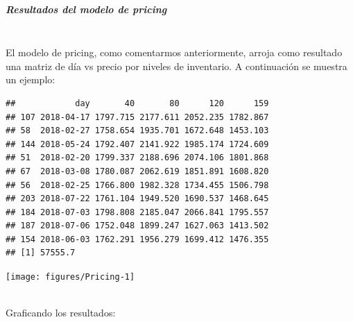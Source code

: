 \documentclass{article}\usepackage[]{graphicx}\usepackage[]{color}
\makeatletter
\newenvironment{kframe}{%
 \def\at@end@of@kframe{}%
 \ifinner\ifhmode%
  \def\at@end@of@kframe{\end{minipage}}%
  \begin{minipage}{\columnwidth}%
 \fi\fi%
 \def\FrameCommand##1{\hskip\@totalleftmargin \hskip-\fboxsep
 \colorbox{shadecolor}{##1}\hskip-\fboxsep
     \hskip-\linewidth \hskip-\@totalleftmargin \hskip\columnwidth}%
 \MakeFramed {\advance\hsize-\width
   \@totalleftmargin\z@ \linewidth\hsize
   \@setminipage}}%
 {\par\unskip\endMakeFramed%
 \at@end@of@kframe}
\newenvironment{knitrout}{}{} %
\makeatother
\begin{document}
\subparagraph{Resultados del modelo de pricing}~\\
El modelo de pricing, como comentarmos anteriormente, arroja como resultado una matriz de día vs precio por niveles de inventario. A continuación se muestra un ejemplo:
~\\
\begin{knitrout}
\color{fgcolor}\begin{kframe}
\begin{verbatim}
##            day       40       80      120      159
## 107 2018-04-17 1797.715 2177.611 2052.235 1782.867
## 58  2018-02-27 1758.654 1935.701 1672.648 1453.103
## 144 2018-05-24 1792.407 2141.922 1985.174 1724.609
## 51  2018-02-20 1799.337 2188.696 2074.106 1801.868
## 67  2018-03-08 1780.087 2062.619 1851.891 1608.820
## 56  2018-02-25 1766.800 1982.328 1734.455 1506.798
## 203 2018-07-22 1761.104 1949.520 1690.537 1468.645
## 184 2018-07-03 1798.808 2185.047 2066.841 1795.557
## 187 2018-07-06 1752.048 1899.247 1627.063 1413.502
## 154 2018-06-03 1762.291 1956.279 1699.412 1476.355
## [1] 57555.7
\end{verbatim}
\end{kframe}
\texttt{[image: figures/Pricing-1]} 

\end{knitrout}
~\\
Graficando los resultados:
~\\
\end{document}
